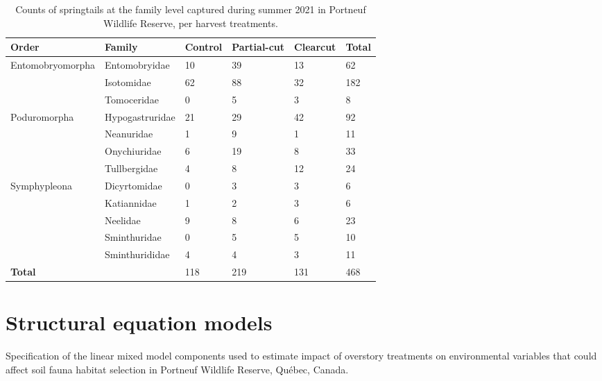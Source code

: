   \begin{table}[ht]
    \centering
    \caption[Counts of springtails at the family level, per harvest treatments]
    {Counts of springtails at the family level captured during summer 2021 in Portneuf Wildlife Reserve, per harvest treatments.}
    \label{tab:springtail}
    \begin{tabular}{llllll} 
        \hline
        Order & Family & Control & Partial-cut & Clearcut & Total \\ [0.5ex] 
        \hline      
        Entomobryomorpha    & Entomobryidae     & 10 & 39 & 13 & 62 \\  
                            & Isotomidae        & 62 & 88 & 32 & 182 \\
                            & Tomoceridae       & 0 & 5 & 3 & 8 \\
        Poduromorpha        & Hypogastruridae   & 21 & 29 & 42 & 92 \\
                            & Neanuridae        & 1 & 9 & 1 & 11 \\
                            & Onychiuridae      & 6 & 19 & 8 & 33 \\
                            & Tullbergidae      & 4 & 8 & 12 & 24 \\
        Symphypleona        & Dicyrtomidae      & 0 & 3 & 3 & 6 \\
                            & Katiannidae       & 1 & 2 & 3 & 6 \\
                            & Neelidae          & 9 & 8 & 6 & 23 \\
                            & Sminthuridae      & 0 & 5 & 5 & 10 \\
                            & Sminthurididae    & 4 & 4 & 3 & 11 \\
                            \hline 
        \textbf{Total}      &                   & 118 & 219 & 131 & 468 \\
        \hline
    \end{tabular}
  \end{table}

  \clearpage

\section{Structural equation models}


\begin{table}[h!]
\caption[Specification of the linear mixed model components used to estimate impact of overstory treatments on environmental variables that could affect soil fauna habitat selection.]
{Specification of the linear mixed model components used to estimate impact of overstory treatments on environmental variables that could affect soil fauna habitat selection in Portneuf Wildlife Reserve, Québec, Canada.}
\label{ann:SEM_Env_eq}
\end{table}


